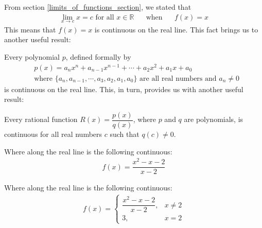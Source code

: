 \begin{recall}
From section \ref{limits_of_functions_section}, we stated that 
\begin{align*}
    \lim_{x \longrightarrow c} x = c \hspace{4pt} \text{for all} \hspace{4pt} x \in \mathbb{R} \hspace{20pt} \text{when} \hspace{20pt} f(x) = x 
\end{align*}
This means that $f(x) = x$ is continuous on the real line. This fact brings us to another useful result:
\end{recall}

\begin{theorem}
Every polynomial $p$, defined formally by
\begin{align*}
    &p(x) = a_{n}x^{n} + a_{n-1}x^{n-1} + \cdots + a_{2}x^{2} + a_{1}x + a_{0}\\[2ex]
    &\text{where} \hspace{4pt} \{a_{n}, a_{n-1}, \cdots , a_{3}, a_{2}, a_{1}, a_{0}\} \hspace{4pt} \text{are all real numbers and} \hspace{4pt} a_{n} \neq 0
\end{align*}
is continuous on the real line. This, in turn, provides us with another useful result:
\end{theorem}

\begin{theorem}
Every rational function $R(x)=\dfrac{p(x)}{q(x)}$, where $p$ and $q$ are polynomials, is continuous for all real numbers $c$ such that $q(c) \neq 0$.
\end{theorem}

\begin{exercise}
Where along the real line is the following continuous:
\begin{align*}
    f(x) = \dfrac{x^{2}-x-2}{x-2}
\end{align*}
\end{exercise}

\begin{exercise}
Where along the real line is the following continuous:
\begin{align*}
    f(x) = 
    \begin{cases}
    \dfrac{x^{2}-x-2}{x-2}, &x \neq 2 \\
    3, & x=2
    \end{cases}
\end{align*}
\end{exercise}

